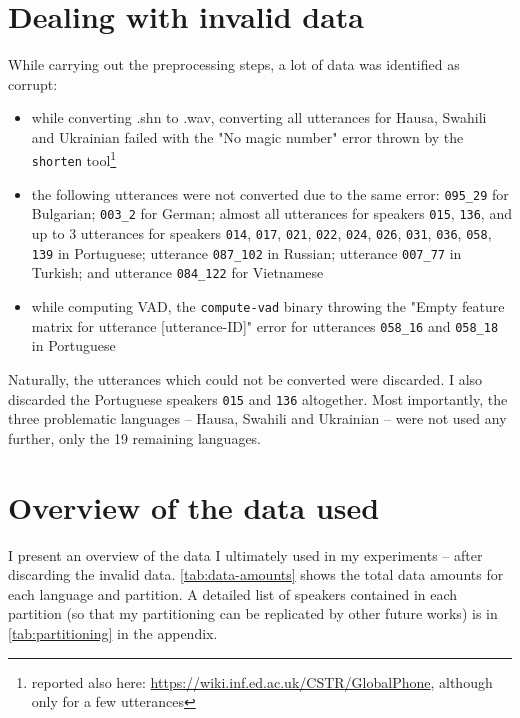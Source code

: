 \documentclass[bsc,frontabs,twoside,singlespacing,parskip,deptreport]{infthesis}
\begin{document}
{  \section{Dealing with invalid data}{
    \label{sec:invalid-data}
    While carrying out the preprocessing steps, a lot of data was identified as corrupt:
    \begin{itemize}
      \item {while converting .shn to .wav, converting all utterances for Hausa, Swahili and Ukrainian failed with the "No magic number" error thrown by the \texttt{shorten} tool\footnote{reported also here: \url{https://wiki.inf.ed.ac.uk/CSTR/GlobalPhone}, although only for a few utterances}}
      \item {the following utterances were not converted due to the same error: \texttt{095\_29} for Bulgarian; \texttt{003\_2} for German; almost all utterances for speakers \texttt{015}, \texttt{136}, and up to 3 utterances for speakers \texttt{014}, \texttt{017}, \texttt{021}, \texttt{022}, \texttt{024}, \texttt{026}, \texttt{031}, \texttt{036}, \texttt{058}, \texttt{139} in Portuguese; utterance \texttt{087\_102} in Russian; utterance \texttt{007\_77} in Turkish; and utterance \texttt{084\_122} for Vietnamese}
      \item {while computing VAD, the \texttt{compute-vad} binary throwing the "Empty feature matrix for utterance [utterance-ID]" error for utterances \texttt{058\_16} and \texttt{058\_18} in Portuguese}
    \end{itemize}

    Naturally, the utterances which could not be converted were discarded. I also discarded the Portuguese speakers \texttt{015} and \texttt{136} altogether. Most importantly, the three problematic languages -- Hausa, Swahili and Ukrainian -- were not used any further, only the 19 remaining languages.
  }

  \section{Overview of the data used}{
    \label{sec:data-overview}
    I present an overview of the data I ultimately used in my experiments -- after discarding the invalid data. \autoref{tab:data-amounts} shows the total data amounts for each language and partition. A detailed list of speakers contained in each partition (so that my partitioning can be replicated by other future works) is in \autoref{tab:partitioning} in the appendix.

}}
\end{document}
